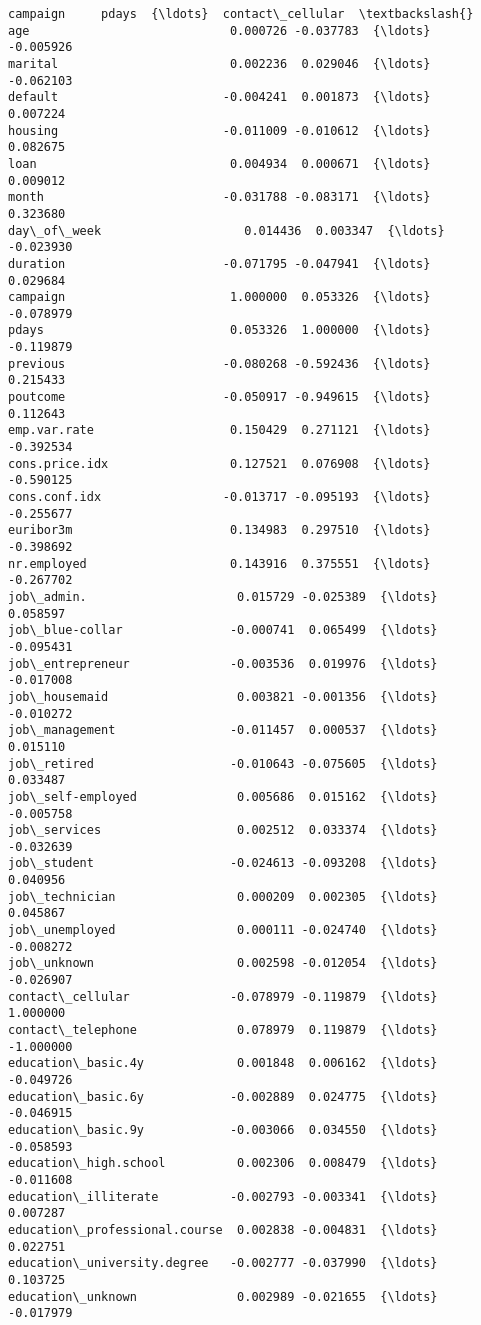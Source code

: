 \documentclass[11pt]{article}
\begin{document}
\begin{tcolorbox}[breakable, size=fbox, boxrule=.5pt, pad at break*=1mm, opacityfill=0]
\begin{Verbatim}[commandchars=\\\{\}]
                               campaign     pdays  {\ldots}  contact\_cellular  \textbackslash{}
age                            0.000726 -0.037783  {\ldots}         -0.005926
marital                        0.002236  0.029046  {\ldots}         -0.062103
default                       -0.004241  0.001873  {\ldots}          0.007224
housing                       -0.011009 -0.010612  {\ldots}          0.082675
loan                           0.004934  0.000671  {\ldots}          0.009012
month                         -0.031788 -0.083171  {\ldots}          0.323680
day\_of\_week                    0.014436  0.003347  {\ldots}         -0.023930
duration                      -0.071795 -0.047941  {\ldots}          0.029684
campaign                       1.000000  0.053326  {\ldots}         -0.078979
pdays                          0.053326  1.000000  {\ldots}         -0.119879
previous                      -0.080268 -0.592436  {\ldots}          0.215433
poutcome                      -0.050917 -0.949615  {\ldots}          0.112643
emp.var.rate                   0.150429  0.271121  {\ldots}         -0.392534
cons.price.idx                 0.127521  0.076908  {\ldots}         -0.590125
cons.conf.idx                 -0.013717 -0.095193  {\ldots}         -0.255677
euribor3m                      0.134983  0.297510  {\ldots}         -0.398692
nr.employed                    0.143916  0.375551  {\ldots}         -0.267702
job\_admin.                     0.015729 -0.025389  {\ldots}          0.058597
job\_blue-collar               -0.000741  0.065499  {\ldots}         -0.095431
job\_entrepreneur              -0.003536  0.019976  {\ldots}         -0.017008
job\_housemaid                  0.003821 -0.001356  {\ldots}         -0.010272
job\_management                -0.011457  0.000537  {\ldots}          0.015110
job\_retired                   -0.010643 -0.075605  {\ldots}          0.033487
job\_self-employed              0.005686  0.015162  {\ldots}         -0.005758
job\_services                   0.002512  0.033374  {\ldots}         -0.032639
job\_student                   -0.024613 -0.093208  {\ldots}          0.040956
job\_technician                 0.000209  0.002305  {\ldots}          0.045867
job\_unemployed                 0.000111 -0.024740  {\ldots}         -0.008272
job\_unknown                    0.002598 -0.012054  {\ldots}         -0.026907
contact\_cellular              -0.078979 -0.119879  {\ldots}          1.000000
contact\_telephone              0.078979  0.119879  {\ldots}         -1.000000
education\_basic.4y             0.001848  0.006162  {\ldots}         -0.049726
education\_basic.6y            -0.002889  0.024775  {\ldots}         -0.046915
education\_basic.9y            -0.003066  0.034550  {\ldots}         -0.058593
education\_high.school          0.002306  0.008479  {\ldots}         -0.011608
education\_illiterate          -0.002793 -0.003341  {\ldots}          0.007287
education\_professional.course  0.002838 -0.004831  {\ldots}          0.022751
education\_university.degree   -0.002777 -0.037990  {\ldots}          0.103725
education\_unknown              0.002989 -0.021655  {\ldots}         -0.017979


\end{Verbatim}
\end{tcolorbox}
\end{document}
